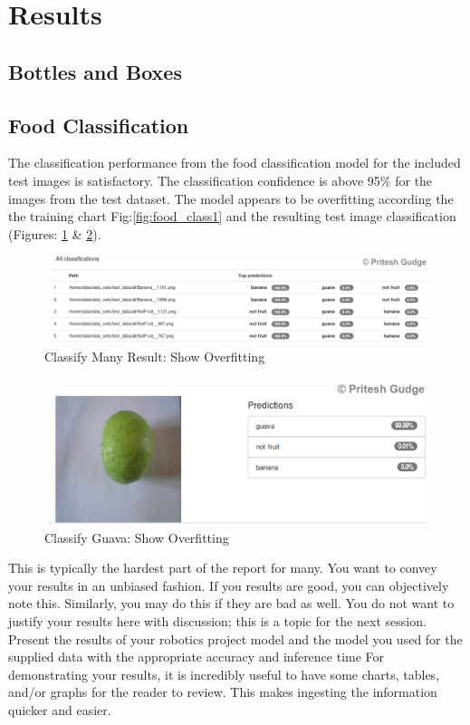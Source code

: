 \documentclass[10pt,journal,compsoc]{IEEEtran}
\begin{document}
\section{Results}
\subsection{Bottles and Boxes}

\subsection{Food Classification}
The classification performance from the food classification model for the included test images is satisfactory. The classification confidence is above 95\% for the images from the test dataset. The model appears to be overfitting according the the training chart Fig:\ref{fig:food_class1} and the resulting test image classification (Figures: \ref{fig:classify_many} \& \ref{fig:classify_guava}).

\begin{figure}[thpb]
      \centering
      \includegraphics[width=\linewidth]{images/classify_many_2}
      \caption{Classify Many Result: Show Overfitting}
      \label{fig:classify_many}
\end{figure}

\begin{figure}[thpb]
      \centering
      \includegraphics[width=\linewidth]{images/classify_guava_2}
      \caption{Classify Guava: Show Overfitting}
      \label{fig:classify_guava}
\end{figure}


This is typically the hardest part of the report for many. You want to convey your results in an unbiased fashion. If you results are good, you can objectively note this. Similarly, you may do this if they are bad as well. You do not want to justify your results here with discussion; this is a topic for the next session. 
Present the results of your robotics project model and the model you used for the supplied data with the appropriate accuracy and inference time
For demonstrating your results, it is incredibly useful to have some charts, tables, and/or graphs for the reader to review. This makes ingesting the information quicker and easier.
\end{document}
